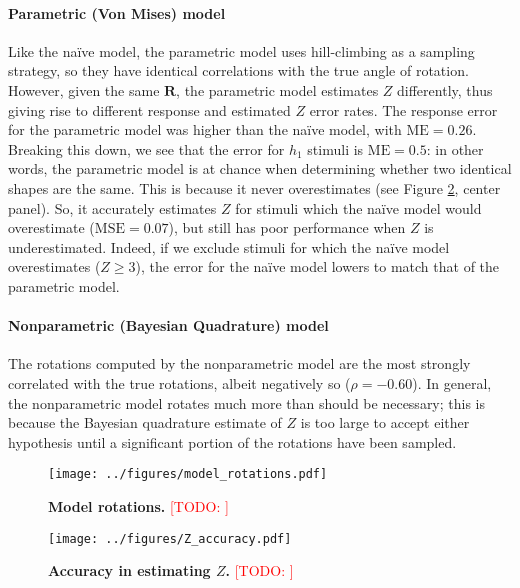 \documentclass{article} %
\newcommand{\TODO}[1]{\textcolor{red}{[TODO: #1]}}
\begin{document}
\paragraph{Parametric (Von Mises) model}

Like the na\"ive model, the parametric model uses hill-climbing as a
sampling strategy, so they have identical correlations with the true
angle of rotation. However, given the same $\mathbf{R}$, the
parametric model estimates $Z$ differently, thus giving rise to
different response and estimated $Z$ error rates. The response error
for the parametric model was higher than the na\"ive model, with
$\mathrm{ME}=0.26$. Breaking this down, we see that the error for
$h_1$ stimuli is $\mathrm{ME}=0.5$: in other words, the parametric
model is at chance when determining whether two identical shapes are
the same. This is because it never overestimates (see Figure
\ref{fig:accuracy}, center panel). So, it accurately estimates $Z$ for
stimuli which the na\"ive model would overestimate
($\mathrm{MSE}=0.07$), but still has poor performance when $Z$ is
underestimated. Indeed, if we exclude stimuli for which the na\"ive
model overestimates ($Z\geq 3$), the error for the na\"ive model
lowers to match that of the parametric model.

\paragraph{Nonparametric (Bayesian Quadrature) model}

The rotations computed by the nonparametric model are the most
strongly correlated with the true rotations, albeit negatively so
($\rho=-0.60$). In general, the nonparametric model rotates much more
than should be necessary; this is because the Bayesian quadrature
estimate of $Z$ is too large to accept either hypothesis until a
significant portion of the rotations have been sampled. 

\begin{figure}[t]
  \centering
  \texttt{[image: ../figures/model\_rotations.pdf]}
  \caption{\textbf{Model rotations.} \TODO{}}
  \label{fig:rotations}
\end{figure}

\begin{figure}[t]
  \centering
  \texttt{[image: ../figures/Z\_accuracy.pdf]}
  \caption{\textbf{Accuracy in estimating $Z$.} \TODO{}}
  \label{fig:accuracy}
\end{figure}
\end{document}
